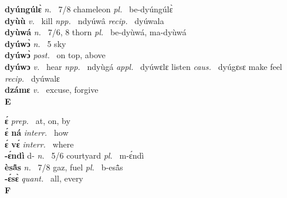 {\bfseries dyúngúlɛ̀}  {\itshape n.~} 7/8 chameleon {\itshape pl.~} be-dyúngúlɛ̀   \\ 
{\bfseries dyùù}  {\itshape v.~} kill   {\itshape npp.~} ndyúwâ {\itshape recip.~} dyúwala  \\ 
{\bfseries dyùwá}  {\itshape n.~} 7/6, 8 thorn {\itshape pl.~} be-dyùwá, ma-dyùwá    \\ 
{\bfseries dyúwɔ̀}  {\itshape n.~} 5 sky    \\ 
{\bfseries dyúwɔ̀}  {\itshape post.~} on top, above    \\ 
{\bfseries dyúwɔ}  {\itshape v.~} hear   {\itshape npp.~} ndyùgá {\itshape appl.~} dyúwɛlɛ listen {\itshape caus.~} dyúgɛsɛ make feel {\itshape recip.~} dyúwalɛ  \\ 
{\bfseries dzámɛ}  {\itshape v.~} excuse, forgive    \\ 

\medskip
\noindent \large {\bfseries E}\normalsize\\
\medskip

\noindent
{\bfseries ɛ́}  {\itshape prep.~} at, on, by    \\ 
{\bfseries ɛ́ ná}  {\itshape interr.~} how    \\ 
{\bfseries ɛ́ vɛ́}  {\itshape interr.~} where    \\ 
{\bfseries -ɛ́ndì} d- {\itshape n.~} 5/6 courtyard {\itshape pl.~} m-ɛ́ndì    \\ 
{\bfseries èsã̂s}  {\itshape n.~} 7/8 gaz, fuel {\itshape pl.~} b-esã̂s    \\ 
{\bfseries -ɛ́sɛ̀}  {\itshape quant.~} all, every    \\
 
\medskip
\noindent \large {\bfseries F}\normalsize\\
\medskip

